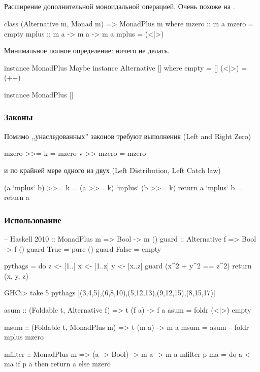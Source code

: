 \documentclass[11pt,a4paper]{article}
\begin{document}
\subsection{}
Расширение дополнительной моноидальной операцией. Очень похоже на .
\begin{hscode}
class (Alternative m, Monad m) => MonadPlus m where
	mzero :: m a
	mzero = empty
	mplus :: m a -> m a -> m a
	mplus = (<|>)
\end{hscode}
Минимальное полное определение: ничего не делать.
\begin{hscode}
instance MonadPlus Maybe
instance Alternative [] where
	empty = []
	(<|>) = (++)

instance MonadPlus []
\end{hscode}
\subsubsection{Законы}
Помимо ,,унаследованных'' законов требуют выполнения (Left and Right Zero)
\begin{hscode}
mzero >>= k = mzero
v >> mzero = mzero
\end{hscode}
и по крайней мере одного из двух (Left Distribution, Left Catch law)
\begin{hscode}
(a `mplus` b) >>= k = (a >>= k) `mplus` (b >>= k)
return a `mplus` b = return a
\end{hscode}
\subsubsection{Использование}
\begin{hscode}
-- Haskell 2010 :: MonadPlus m => Bool -> m ()
guard :: Alternative f => Bool -> f ()
guard True = pure ()
guard False = empty

pythags = do
	z <- [1..]
	x <- [1..z]
	y <- [x..z]
	guard (x^2 + y^2 == z^2)
	return (x, y, z)

GHCi> take 5 pythags
[(3,4,5),(6,8,10),(5,12,13),(9,12,15),(8,15,17)]

asum :: (Foldable t, Alternative f) => t (f a) -> f a
asum = foldr (<|>) empty

msum :: (Foldable t, MonadPlus m) => t (m a) -> m a
msum = asum  -- foldr mplus mzero

mfilter :: MonadPlus m => (a -> Bool) -> m a -> m a
mfilter p ma = do
	a <- ma
	if p a
	then return a
	else mzero
\end{hscode}
\end{document}
